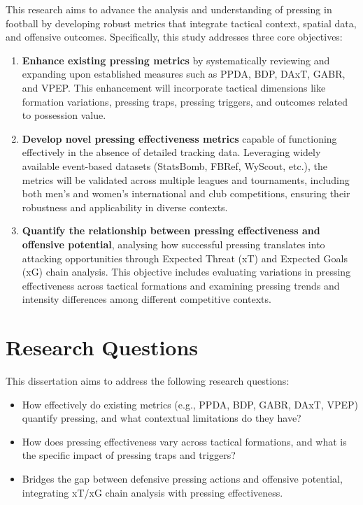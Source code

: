 This research aims to advance the analysis and understanding of pressing in football by developing robust metrics that integrate tactical context, spatial data, and offensive outcomes. Specifically, this study addresses three core objectives:
\begin{enumerate}
    \item \textbf{Enhance existing pressing metrics} by systematically reviewing and expanding upon established measures such as PPDA, BDP, DAxT, GABR, and VPEP. This enhancement will incorporate tactical dimensions like formation variations, pressing traps, pressing triggers, and outcomes related to possession value.
    \item \textbf{Develop novel pressing effectiveness metrics} capable of functioning effectively in the absence of detailed tracking data. Leveraging widely available event-based datasets (StatsBomb, FBRef, WyScout, etc.), the metrics will be validated across multiple leagues and tournaments, including both men's and women's international and club competitions, ensuring their robustness and applicability in diverse contexts.
    \item \textbf{Quantify the relationship between pressing effectiveness and offensive potential}, analysing how successful pressing translates into attacking opportunities through Expected Threat (xT) and Expected Goals (xG) chain analysis. This objective includes evaluating variations in pressing effectiveness across tactical formations and examining pressing trends and intensity differences among different competitive contexts.
\end{enumerate}

\section{Research Questions}

This dissertation aims to address the following research questions:
\begin{itemize}
    \item How effectively do existing metrics (e.g., PPDA, BDP, GABR, DAxT, VPEP) quantify pressing, and what contextual limitations do they have?
    \item How does pressing effectiveness vary across tactical formations, and what is the specific impact of pressing traps and triggers?
    \item Bridges the gap between defensive pressing actions and offensive potential, integrating xT/xG chain analysis with pressing effectiveness.
\end{itemize}


